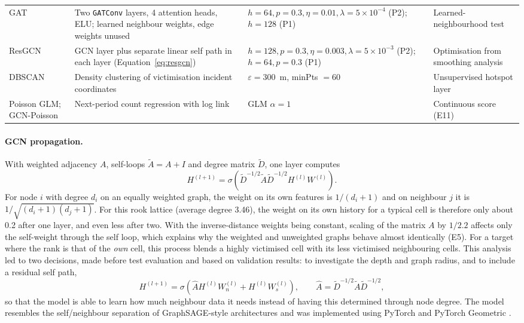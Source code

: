 \documentclass[11pt,a4paper]{report}
\begin{document}
\begin{table}[H]
\begin{tabularx}{\textwidth}{@{}L{2.0cm} Y L{4.6cm} L{2.4cm}@{}}
GAT & Two \texttt{GATConv} layers, 4 attention heads, ELU; learned neighbour weights, edge weights unused \citep{velickovic2018} & $h=64,p=0.3,\eta=0.01,\lambda=5\times10^{-4}$ (P2); $h=128$ (P1) & Learned-neighbourhood test\\
ResGCN & GCN layer plus separate linear self path in each layer (Equation~\ref{eq:resgcn}) & $h=128,p=0.3,\eta=0.003,\lambda=5\times10^{-3}$ (P2); $h=64,p=0.3$ (P1) & Optimisation from smoothing analysis\\
DBSCAN & Density clustering of victimisation incident coordinates \citep{ester1996} & $\varepsilon=300$~m, minPts $=60$ & Unsupervised hotspot layer\\
Poisson GLM; GCN-Poisson & Next-period count regression with log link & GLM $\alpha=1$ & Continuous score (E11)\\
\bottomrule
\end{tabularx}
\end{table}

\paragraph{GCN propagation.} With weighted adjacency $A$, self-loops $\tilde{A}=A+I$ and degree matrix $\tilde{D}$, one layer computes
\begin{equation}
H^{(l+1)}=\sigma\!\left(\tilde{D}^{-1/2}\tilde{A}\tilde{D}^{-1/2}H^{(l)}W^{(l)}\right).
\label{eq:gcn}
\end{equation}
For node $i$ with degree $d_i$ on an equally weighted graph, the weight on its own features is $1/(d_i+1)$ and on neighbour $j$ it is $1/\sqrt{(d_i+1)(d_j+1)}$. For this rook lattice (average degree 3.46), the weight on its own history for a typical cell is therefore only about 0.2 after one layer, and even less after two. With the inverse-distance weights being constant, scaling of the matrix $A$ by $1/2.2$ affects only the self-weight through the self loop, which explains why the weighted and unweighted graphs behave almost identically (E5). For a target where the rank is that of the \emph{own} cell, this process blends a highly victimised cell with its less victimised neighbouring cells. This analysis led to two decisions, made before test evaluation and based on validation results: to investigate the depth and graph radius, and to include a residual self path,
\begin{equation}
H^{(l+1)}=\sigma\!\left(\hat{A}H^{(l)}W_n^{(l)}+H^{(l)}W_s^{(l)}\right),\qquad \hat{A}=\tilde{D}^{-1/2}\tilde{A}\tilde{D}^{-1/2},
\label{eq:resgcn}
\end{equation}
so that the model is able to learn how much neighbour data it needs instead of having this determined through node degree. The model resembles the self/neighbour separation of GraphSAGE-style architectures and was implemented using PyTorch and PyTorch Geometric \citep{paszke2019,fey2019}.
\end{document}
